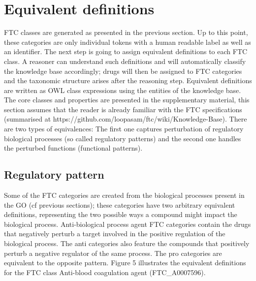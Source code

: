 \documentclass{bioinfo}
\begin{document}
\section{Equivalent definitions}
FTC classes are generated as presented in the previous section. Up to this point, these categories 
are only individual tokens with a human readable label as well as an identifier. The next step is going to 
assign equivalent definitions to each FTC class. A reasoner can understand such definitions and will automatically 
classify the knowledge base accordingly; drugs will then be assigned to FTC categories and the taxonomic structure 
arises after the reasoning step. Equivalent definitions are written as OWL class expressions using the entities of 
the knowledge base. The core classes and properties are presented in the supplementary material, this section assumes 
that the reader is already familiar with the FTC specifications (summarised at {{https://github.com/loopasam/ftc/wiki/Knowledge-Base}}). 
There are two types of equivalences: The first one captures perturbation of regulatory 
biological processes (so called regulatory patterns) and the second one handles the perturbed functions (functional patterns).

\subsection{Regulatory pattern}
Some of the FTC categories are created from the biological processes present in the 
GO (cf previous sections); these categories have two arbitrary equivalent definitions, representing the 
two possible ways a compound might impact the biological process. Anti-biological process agent FTC categories 
contain the drugs that negatively perturb a target involved in the positive regulation of the biological process. 
The anti categories also feature the compounds that positively perturb a negative regulator of the same process. 
The pro categories are equivalent to the opposite pattern. Figure 5 illustrates the equivalent definitions for the 
FTC class Anti-blood coagulation agent (FTC\_A0007596).
 
\end{document}
